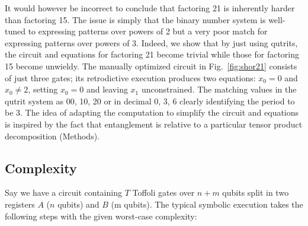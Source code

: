 \documentclass[sigplan,review]{acmart}
\begin{document}
It would however be incorrect to conclude that factoring 21 is
inherently harder than factoring 15. The issue is simply that the
binary number system is well-tuned to expressing patterns over powers
of 2 but a very poor match for expressing patterns over powers of
3. Indeed, we show that by just using qutrits, the circuit and
equations for factoring 21 become trivial while those for factoring 15
become unwieldy. The manually optimized circuit in
Fig.~\ref{fig:shor21} consists of just three gates; its retrodictive
execution produces two equations: $x_0=0$ and $x_0 \neq 2$, setting
$x_0=0$ and leaving $x_1$ unconstrained. The matching values in the
qutrit system as 00, 10, 20 or in decimal 0, 3, 6 clearly identifying
the period to be 3. The idea of adapting the computation to simplify
the circuit and equations is inspired by the fact that entanglement is
relative to a particular tensor product decomposition (Methods).

\subsection*{Complexity}

Say we have a circuit containing $T$ Toffoli gates over $n+m$ qubits
split in two registers $A$ ($n$ qubits) and $B$ (m qubits). The
typical symbolic execution takes the following steps with the given
worst-case complexity:
\end{document}
